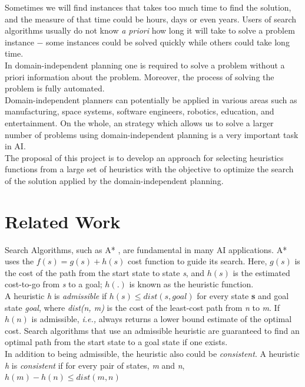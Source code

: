 \documentclass[a4paper,12pt]{article}
\begin{document}
Sometimes we will find instances that takes too much time to find the solution, and the measure of that time could be hours, days or even years. Users of search algorithms usually do not know \textit{a priori} how long it will take to solve a problem instance $-$ some instances could be solved quickly while others could take long time.\\

In domain-independent planning one is required to solve a problem without a priori information about the problem. Moreover, the process of solving the problem is fully automated.\\

Domain-independent planners can potentially be applied in various areas such as manufacturing, space systems, software engineers, robotics, education, and entertainment. On the whole, an strategy which allows us to solve a larger number of problems using domain-independent planning is a very important task in AI.\\

The proposal of this project is to develop an approach for selecting heuristics functions from a large set of heuristics with the objective to optimize the search of the solution applied by the domain-independent planning.

\section{Related Work}
Search Algorithms, such as A* \citep{hart1968formal}, are fundamental in many AI applications. A* uses the $f(s) = g(s) + h(s)$ cost function to guide its search. Here, $g(s)$ is the cost of the path from the start state to state \textit{s}, and $h(s)$ is the estimated cost-to-go from \textit{s} to a goal; $h(.)$ is known as the heuristic function.\\

 A heuristic \textit{h} is \textit{admissible} if $h(s) \leq dist(s, goal)$ for every state \textbf{s} and goal state \textit{goal}, where \textit{dist(n, m)} is the cost of the least-cost path from \textit{n} to \textit{m}. If $h(n)$ is admissible, \textit{i.e.,} always returns a lower bound estimate of the optimal cost. Search algorithms that use an admissible heuristic are guaranteed to find an optimal path from the start state to a goal state if one exists.\\

In addition to being admissible, the heuristic also could be \textit{consistent}. A heuristic \textit{h} is \textit{consistent} if for every pair of states, \textit{m} and \textit{n}, $h(m) - h(n) \leq dist(m, n)$\\
\end{document}
